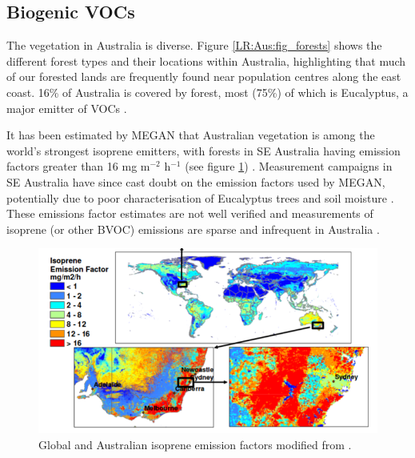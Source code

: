   
  \subsection{Biogenic VOCs}
    
    The vegetation in Australia is diverse.
    Figure \ref{LR:Aus:fig_forests} shows the different forest types and their locations within Australia, highlighting that much of our forested lands are frequently found near population centres along the east coast.
    16\% of Australia is covered by forest, most (75\%) of which is Eucalyptus, a major emitter of VOCs \parencite{Guenther2012}.
    
    
    It has been estimated by MEGAN that Australian vegetation is among the world's strongest isoprene emitters, with forests in SE Australia having emission factors greater than 16 mg m$^{-2}$ h$^{-1}$ (see figure \ref{LR:Aus:fig_MEGAN_EF}) \parencite{Guenther2006,Guenther2012}.
    Measurement campaigns in SE Australia have since cast doubt on the emission factors used by MEGAN, potentially due to poor characterisation of Eucalyptus trees and soil moisture \parencite{Emmerson2016,Emmerson2019}.
    These emissions factor estimates are not well verified and measurements of isoprene (or other BVOC) emissions are sparse and infrequent in Australia \parencite{Sindelarova2014, Bauwens2016}.
    
    \begin{figure}
      \includegraphics[width=\textwidth]{Figures/MeganIsoprene1_final.png}
      \caption{Global and Australian isoprene emission factors modified from \textcite{Guenther2006}.}
      \label{LR:Aus:fig_MEGAN_EF}
    \end{figure}
    
